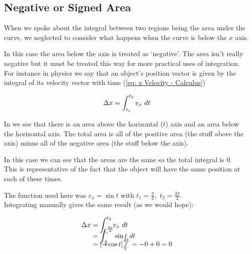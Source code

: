 \documentclass[main.tex]{subfiles}
\begin{document}
            \newpage

            \subsection{Negative or Signed Area}
                \label{subsec: Negative Area}

                When we spoke about the integral between two regions being the area under the curve, we neglected to consider what happens when the curve is below the $x$ axis. 

                In this case the area below the axis is treated as `negative'. The area isn't really negative but it must be treated this way for more practical uses of integration.
                For instance in physics we say that an object's position vector is given by the integral of its velocity vector with time (\eqref{eq: x Velocity - Calculus})

                \begin{equation}
                    \Delta x = \int_{t_1}^{t_2} v_x \, \, d t
                    \label{eq: x Velocity - Calculus}
                \end{equation}

                In  we see that there is an area above the horizontal ($t$) axis and an area below the horizontal axis. The total area is all of the positive area (the stuff above the axis) minus all of the negative area (the stuff below the axis).
                
                In this case we can see that the areas are the same so the total integral is 0.\\
                This is representative of the fact that the object will have the same position at each of these times.

                The function used here was $v_x = \sin t$ with $t_1 = \frac{\pi}{2}, \, \, t_2 = \frac{3\pi}{2}$.\\
                Integrating manually gives the same result (as we would hope):

                \begin{align*}
                    \Delta x &= \int_{t_1}^{t_2} v_x \, \, d t\\[-1.5em]
                    &= \int_{\frac{\pi}{2}}^{\frac{3\pi}{2}} \sin t \, \, d t \\[-1.5em]
                    &= \left[-\cos t\right]_{\frac{\pi}{2}}^{\frac{3\pi}{2}} = -0 + 0 = 0
                \end{align*}
\end{document}

